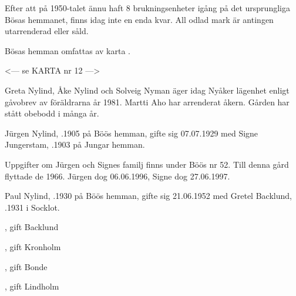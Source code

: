Efter att på 1950-talet ännu haft 8 brukningsenheter igång på det ursprungliga Bösas hemmanet, finns idag inte en enda kvar. All odlad  mark är antingen  utarrenderad eller såld.

Bösas hemman omfattas av karta .

<--- se KARTA nr 12 --->





Greta Nylind, Åke Nylind och Solveig Nyman äger idag Nyåker lägenhet enligt gåvobrev av föräldrarna år 1981.
Martti Aho har arrenderat åkern. Gården har stått obebodd i många år.



Jürgen Nylind, .1905 på Böös hemman, gifte sig 07.07.1929 med Signe Jungerstam, .1903 på Jungar hemman.
\begin{jhchildren}
  \item {}
  \item {}
  \item {}
  \item {}
  \item {}
  \item {}
\end{jhchildren}

Uppgifter om Jürgen och Signes familj finns under Böös nr 52. Till denna gård flyttade de 1966.
Jürgen dog 06.06.1996, Signe dog 27.06.1997.


Paul Nylind, .1930 på Böös hemman, gifte sig 21.06.1952 med Gretel Backlund, .1931 i Socklot.
\begin{jhchildren}
  \item {}, gift Backlund
  \item {}, gift Kronholm
  \item {}, gift Bonde
  \item {}, gift Lindholm
\end{jhchildren}

